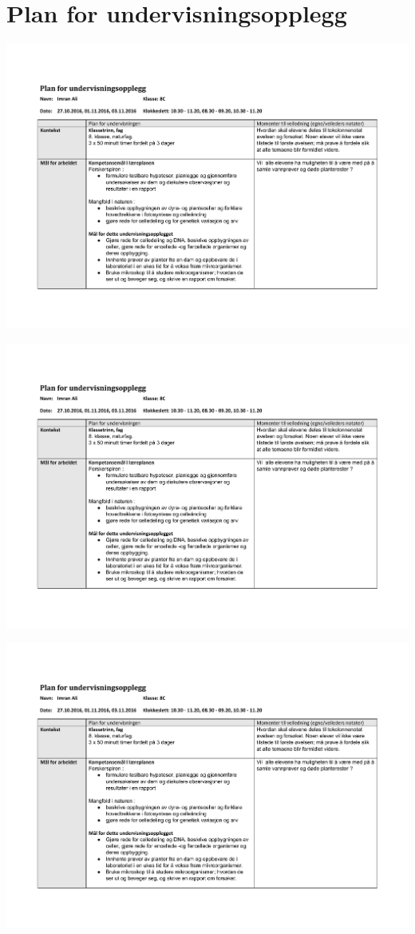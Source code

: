 \documentclass[main.tex]{subfiles}
\begin{document}
\section{Plan for undervisningsopplegg}
\hspace{-2cm}\vspace{-10cm}\includegraphics[page = 1,scale = 1,angle=90]{../figures/Del_B_plan_for_undervisningsopplegg.pdf}

\hspace{-3cm}\vspace{-10cm}\includegraphics[page = 2,scale = 1,angle=90]{../figures/Del_B_plan_for_undervisningsopplegg.pdf}

\hspace{-2cm}\vspace{-10cm}\includegraphics[page = 3,scale = 1,angle=90]{../figures/Del_B_plan_for_undervisningsopplegg.pdf}
\end{document}
